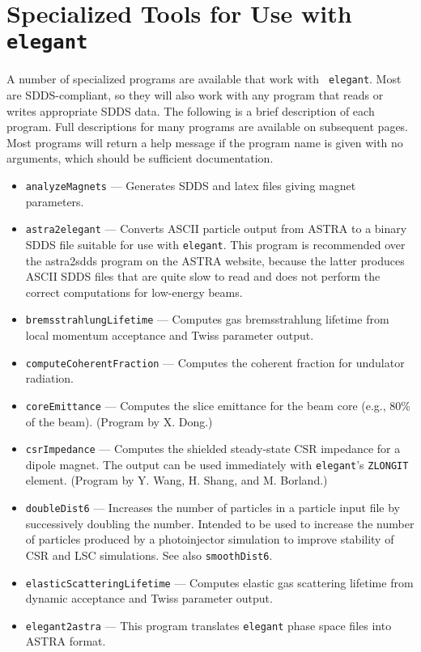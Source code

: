 \documentclass[11pt]{article}
\begin{document}
\newpage
\section{Specialized Tools for Use with {\tt elegant}}

A number of specialized programs are available that work with {\tt
elegant}. Most are SDDS-compliant, so they will also work with any
program that reads or writes appropriate SDDS data.  The following is
a brief description of each program.  Full descriptions for many programs are available
on subsequent pages.  Most programs will return a help message if the program name is
given with no arguments, which should be sufficient documentation.
\begin{itemize}
\item {\tt analyzeMagnets} --- Generates SDDS and latex files giving magnet parameters.
\item {\tt astra2elegant} --- Converts ASCII particle output from ASTRA \cite{ASTRA} to a binary
  SDDS file suitable for use with {\tt elegant}.  This program is recommended over
  the astra2sdds program on the ASTRA website, because the latter produces ASCII SDDS
  files that are quite slow to read and does not perform the correct computations
  for low-energy beams.
\item {\tt bremsstrahlungLifetime} --- Computes gas bremsstrahlung lifetime from local momentum acceptance and Twiss parameter output.
\item {\tt computeCoherentFraction} --- Computes the coherent fraction for undulator radiation.
\item {\tt coreEmittance} --- Computes the slice emittance for the beam core (e.g., 80\% of the beam).
  (Program by X. Dong.)
\item {\tt csrImpedance} --- Computes the shielded steady-state CSR impedance for a dipole magnet.
 The output can be used immediately with {\tt elegant}'s \verb|ZLONGIT| element.
 (Program by Y. Wang, H. Shang, and M. Borland.)
\item {\tt doubleDist6} --- Increases the number of particles in a particle input file by
 successively doubling the number.  Intended to be used to increase the number of particles
 produced by a photoinjector simulation to improve stability of CSR and LSC simulations.
 See also {\tt smoothDist6}.
\item {\tt elasticScatteringLifetime} --- Computes elastic gas scattering lifetime from dynamic acceptance and Twiss parameter output.
\item {\tt elegant2astra} --- This program translates {\tt elegant} phase space files into ASTRA \cite{ASTRA} format.

\end{itemize}
\end{document}
